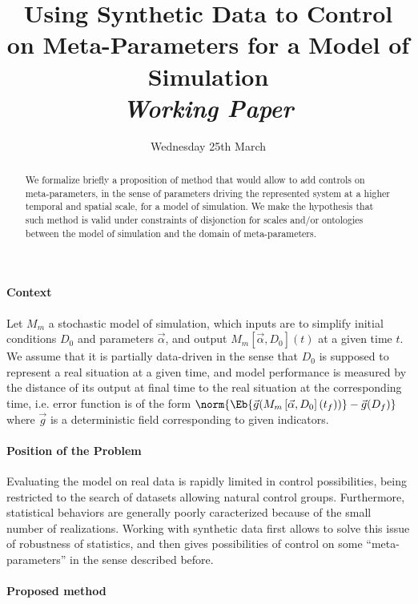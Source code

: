 


\title{Using Synthetic Data to Control on Meta-Parameters for a Model of Simulation\bigskip\\
\textit{Working Paper}
}
\author{}
\date{Wednesday 25th March}


\maketitle

\begin{abstract}
We formalize briefly a proposition of method that would allow to add controls on meta-parameters, in the sense of parameters driving the represented system at a higher temporal and spatial scale, for a model of simulation. We make the hypothesis that such method is valid under constraints of disjonction for scales and/or ontologies between the model of simulation and the domain of meta-parameters.
\end{abstract}


\paragraph{Context}

Let $M_{m}$ a stochastic model of simulation, which inputs are to simplify initial conditions $D_0$ and parameters $\vec{\alpha}$, and output $M_{m}\left[\vec{\alpha},D_0\right](t)$ at a given time $t$. We assume that it is partially data-driven in the sense that $D_0$ is supposed to represent a real situation at a given time, and model performance is measured by the distance of its output at final time to the real situation at the corresponding time, i.e. error function is of the form $\norm{\Eb{\vec{g}(M_{m}\left[\vec{\alpha},D_0\right](t_f))}-\vec{g}(D_f)}$ where $\vec{g}$ is a deterministic field corresponding to given indicators.



\paragraph{Position of the Problem}

Evaluating the model on real data is rapidly limited in control possibilities, being restricted to the search of datasets allowing natural control groups. Furthermore, statistical behaviors are generally poorly caracterized because of the small number of realizations. Working with synthetic data first allows to solve this issue of robustness of statistics, and then gives possibilities of control on some ``meta-parameters'' in the sense described before.


\paragraph{Proposed method}

















